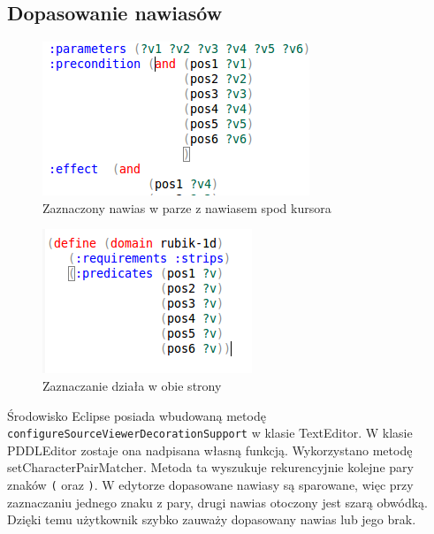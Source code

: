 \subsection{Dopasowanie nawiasów}
\begin{figure}[h]
  \centering
    \includegraphics{img/matched-bracket.png}
    \caption{Zaznaczony nawias w parze z nawiasem spod kursora}
    \label{ana_structure}
\end{figure}
\begin{figure}[h]
  \centering
    \includegraphics{img/matched-bracket-reverse.png}
    \caption{Zaznaczanie działa w obie strony}
    \label{ana_structure}
\end{figure}
Środowisko Eclipse posiada wbudowaną metodę \texttt{configureSourceViewerDecorationSupport} w klasie TextEditor. W klasie PDDLEditor zostaje ona nadpisana własną funkcją. Wykorzystano metodę setCharacterPairMatcher. Metoda ta wyszukuje rekurencyjnie kolejne pary znaków \texttt{(} oraz \texttt{)}.  W edytorze dopasowane nawiasy są sparowane, więc przy zaznaczaniu jednego znaku z pary, drugi nawias otoczony jest szarą obwódką. Dzięki temu użytkownik szybko zauważy dopasowany nawias lub jego brak.
